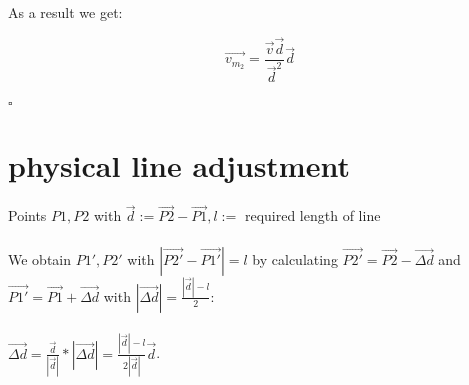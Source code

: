 \documentclass[a4paper]{article}
\begin{document}
As a result we get:

\begin{displaymath}
  \vec{v_{m_2}}=\frac{\vec{v}\vec{d}}{\vec{d}^2}\vec{d}
\end{displaymath}
\\
$\square$

\newpage
\section{physical line adjustment}
Points $P1,P2$ with $\vec{d}:=\vec{P2}-\vec{P1}, l:=$ required length of line\\\\
We obtain $P1',P2'$ with $|\vec{P2'}-\vec{P1'}|=l$ by calculating $\vec{P2'}=\vec{P2}-\vec{\Delta d}$ and $\vec{P1'}=\vec{P1}+\vec{\Delta d}$ with
$|\vec{\Delta d}|=\frac{|\vec{d}|-l}{2}$:\\\\
$\vec{\Delta d}=\frac{\vec{d}}{|\vec{d}|}*|\vec{\Delta d}|=\frac{|\vec{d}|-l}{2|\vec{d}|}\vec{d}$.
\end{document}
